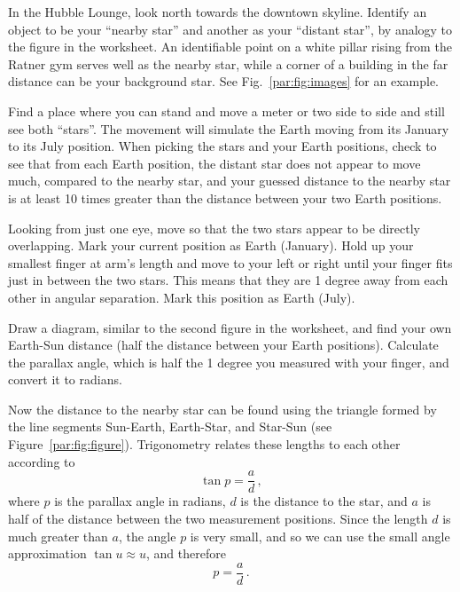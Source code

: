 \begin{steps}
	\item In the Hubble Lounge, look north towards the downtown skyline. Identify an object to be your ``nearby star'' and another as your ``distant star'', by analogy to the figure in the worksheet. An identifiable point on a white pillar rising from the Ratner gym serves well as the nearby star, while a corner of a building in the far distance can be your background star. See Fig.~\ref{par:fig:images} for an example.
	
	\item Find a place where you can stand and move a meter or two side to side and still see both ``stars''. The movement will simulate the Earth moving from its January to its July position. When picking the stars and your Earth positions, check to see that from each Earth position, the distant star does not appear to move much, compared to the nearby star, and your guessed distance to the nearby star is at least 10 times greater than the distance between your two Earth positions.
	
	\item Looking from just one eye, move so that the two stars appear to be directly overlapping. Mark your current position as Earth (January). Hold up your smallest finger at arm's length and move to your left or right until your finger fits just in between the two stars. This means that they are 1 degree away from each other in angular separation. Mark this position as Earth (July).
	
	\item Draw a diagram, similar to the second figure in the worksheet, and find your own Earth-Sun distance (half the distance between your Earth positions). Calculate the parallax angle, which is half the 1 degree you measured with your finger, and convert it to radians.
\end{steps}
	
Now the distance to the nearby star can be found using the triangle formed by the line segments Sun-Earth, Earth-Star, and Star-Sun (see Figure~\ref{par:fig:figure}). Trigonometry relates these lengths to each other according to
\begin{equation}
	\tan p = \frac{a}{d}\,,
\end{equation}
where $p$ is the parallax angle in radians, $d$ is the distance to the star, and $a$ is half of the distance between the two measurement positions. Since the length $d$ is much greater than $a$, the angle $p$ is very small, and so we can use the small angle approximation $\tan u \approx u$, and therefore
\begin{equation}\label{par:eq:pad}
	p = \frac{a}{d}\,.
\end{equation}

